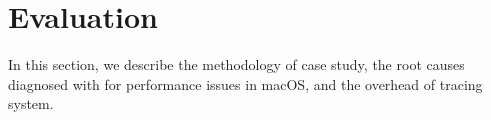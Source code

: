 \section{Evaluation}\label{sec:eval}

In this section, we describe the methodology of case study, the root causes
diagnosed with \xxx for performance issues in macOS, and the overhead of \xxx
tracing system.






